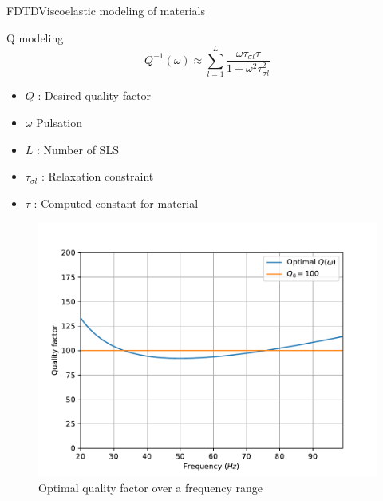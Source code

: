 \documentclass[9pt, xcolor={usenames, dvipsnames}]{beamer}
\begin{document}
				\begin{frame}{FDTD}{Viscoelastic modeling of materials}
					\begin{minipage}[t]{0.48\textwidth}

						\begin{alertblock}{Q modeling}
							\begin{equation}
								Q^{-1}(\omega) \approx \sum_{l=1}^L \frac{\omega \tau_{\sigma l} \tau}{1 + \omega^2\tau_{\sigma l}^2}
							\end{equation}
							\begin{itemize}
								\item $Q$ : Desired quality factor 
								\item $\omega$ Pulsation
								\item $L$ : Number of SLS
								\item $\tau_{\sigma l}$ : Relaxation constraint
								\item $\tau$ : Computed constant for material
							\end{itemize}
						\end{alertblock}
					\end{minipage}
					\hfill
					\begin{minipage}[t]{0.48\textwidth}
						\begin{figure}
							\includegraphics[width=\textwidth]{images/quality_factor.pdf}
							\caption{Optimal quality factor over a frequency range}
						\end{figure}
					\end{minipage}
				\end{frame}
\end{document}
